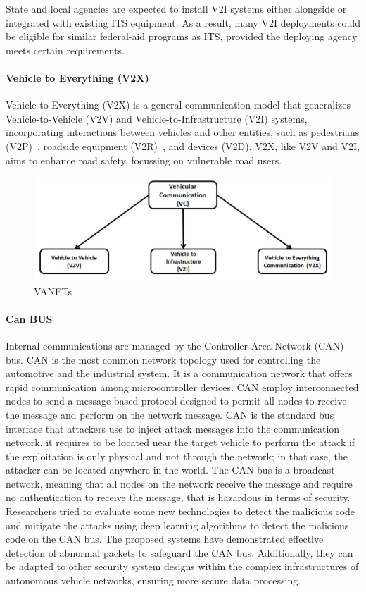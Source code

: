 State and local agencies are expected to install V2I systems either alongside or integrated with existing ITS equipment.
As a result, many V2I deployments could be eligible for similar federal-aid programs as ITS,
provided the deploying agency meets certain requirements\cite{dot2024v2i}.

\paragraph{Vehicle to Everything (V2X)}

Vehicle-to-Everything (V2X) is a general communication model that generalizes Vehicle-to-Vehicle (V2V) and Vehicle-to-Infrastructure (V2I) systems,
incorporating interactions between vehicles and other entities, such as pedestrians (V2P)~\cite{vehicle-to-pedestrian}, roadside equipment (V2R)~\cite{vehicle-to-roadside}, and devices (V2D).
V2X, like V2V and V2I, aims to enhance road safety, focussing on vulnerable road users.

\begin{figure}[!htb]
    \centering
    \includegraphics[width=0.7\linewidth]{figures/communication}
    \caption{VANETs}
    \label{fig:communication}
\end{figure}

\paragraph{Can BUS}
Internal communications are managed by the Controller Area Network (CAN) bus.
CAN is the most common network topology used for controlling the automotive and the industrial system.
It is a communication network that offers rapid communication among microcontroller
devices.
CAN employ interconnected nodes to send a message-based protocol designed to
permit all nodes to receive the message and perform on the network message\cite{canbus}.
CAN is the standard bus interface that attackers use to inject attack messages into the
communication network, it requires to be located near the target vehicle to perform the attack if the exploitation is only physical and not through the network; in that case, the attacker can be located anywhere in the world.
The CAN bus is a broadcast network, meaning that all nodes on the network receive the message and require no authentication to receive the message, that is hazardous in terms of security.
Researchers tried to evaluate some new technologies to detect the malicious code and mitigate the attacks\cite{aldhyani2022attacks} using deep learning algorithms to detect the malicious code on the CAN bus.
The proposed systems have demonstrated effective detection of abnormal packets to safeguard the CAN bus.
Additionally, they can be adapted to other security system designs within the complex infrastructures of autonomous vehicle networks, ensuring more secure data processing.

